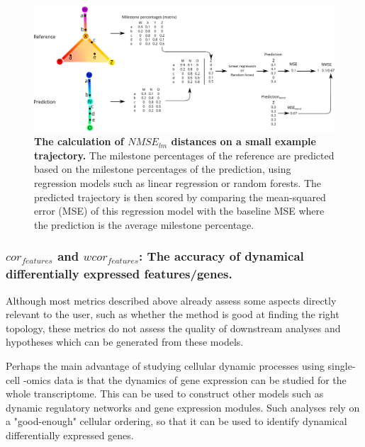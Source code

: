 \begin{figure}[tbh!]
	\centering\includegraphics[width=\linewidth]{fig/snote1fig_7.pdf}
	\caption{
		\textbf{The calculation of $\textit{NMSE}_{\textit{lm}}$ distances on a small example trajectory.} 
		The milestone percentages of the reference are predicted based on the milestone percentages of the prediction, using regression models such as linear regression or random forests. The predicted trajectory is then scored by comparing the mean-squared error (MSE) of this regression model with the baseline MSE where the prediction is the average milestone percentage.
	}
	\label{fig:snote1fig_7}
\end{figure}

\subsubsection{$\textit{cor}_{\textit{features}}$ and $\textit{wcor}_{\textit{features}}$: The accuracy of dynamical differentially expressed features/genes.}

Although most metrics described above already assess some aspects directly relevant to the user, such as whether the method is good at finding the right topology, these metrics do not assess the quality of downstream analyses and hypotheses which can be generated from these models. 

Perhaps the main advantage of studying cellular dynamic processes using single-cell -omics data is that the dynamics of gene expression can be studied for the whole transcriptome. This can be used to construct other models such as dynamic regulatory networks and gene expression modules. Such analyses rely on a "good-enough" cellular ordering, so that it can be used to identify dynamical differentially expressed genes.

